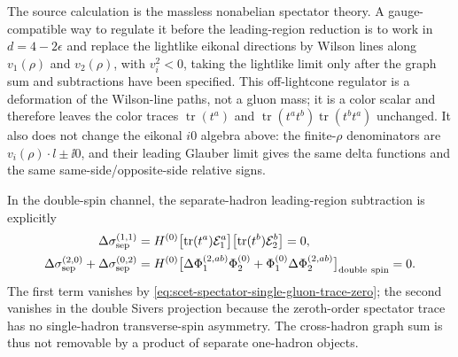 \begin{controlledapproximation}
The source calculation is the massless nonabelian spectator theory.  A
gauge-compatible way to regulate it before the leading-region reduction is to
work in \(d=4-2\epsilon\) and replace the lightlike eikonal directions by
Wilson lines along \(v_1(\rho)\) and \(v_2(\rho)\), with \(v_i^2<0\), taking
the lightlike limit only after the graph sum and subtractions have been
specified.  This off-lightcone regulator is a deformation of the Wilson-line
paths, not a gluon mass; it is a color scalar and therefore leaves the color
traces \(\operatorname{tr}(t^a)\) and
\(\operatorname{tr}(t^at^b)\operatorname{tr}(t^bt^a)\) unchanged.  It also
does not change the eikonal \(i0\) algebra above: the finite-\(\rho\)
denominators are \(v_i(\rho)\cdot l\pm\ii0\), and their leading Glauber
limit gives the same delta functions and the same same-side/opposite-side
relative signs.

In the double-spin channel, the separate-hadron leading-region subtraction is
explicitly
\[
\begin{aligned}
  \Delta\sigma_{\rm sep}^{(1,1)}
  &=
  H^{(0)}
  \bigl[\operatorname{tr}(t^a)\mathcal E_{1}^{a}\bigr]
  \bigl[\operatorname{tr}(t^b)\mathcal E_{2}^{b}\bigr]
  =0,\\
  \Delta\sigma_{\rm sep}^{(2,0)}+\Delta\sigma_{\rm sep}^{(0,2)}
  &=
  H^{(0)}
  \bigl[\Delta\Phi_1^{(2,ab)}\Phi_2^{(0)}
  +\Phi_1^{(0)}\Delta\Phi_2^{(2,ab)}\bigr]_{\rm double\ spin}
  =0 .
\end{aligned}
\]
The first term vanishes by
\eqref{eq:scet-spectator-single-gluon-trace-zero}; the second vanishes in the
double Sivers projection because the zeroth-order spectator trace has no
single-hadron transverse-spin asymmetry.  The cross-hadron graph sum is thus
not removable by a product of separate one-hadron objects.


\end{controlledapproximation}
